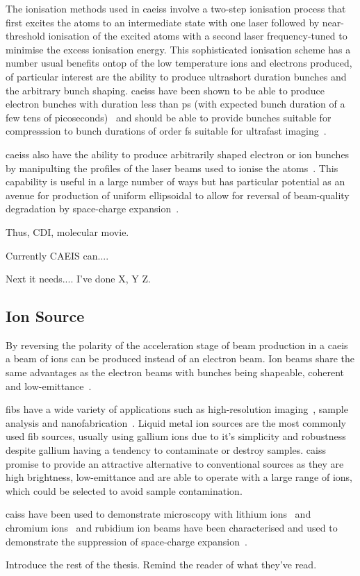 The ionisation methods used in \glspl{caeis} involve a two-step ionisation process that first excites the atoms to an intermediate state with one laser followed by near-threshold ionisation of the excited atoms with a second laser frequency-tuned to minimise the excess ionisation energy.
This sophisticated ionisation scheme has a number usual benefits ontop of the low temperature ions and electrons produced, of particular interest are the ability to produce ultrashort duration bunches and the arbitrary bunch shaping.
\Glspl{caeis} have been shown to be able to produce electron bunches with duration less than \unit[130]{ps} (with expected bunch duration of a few tens of picoseconds)~\cite{speirs_identification_2017} and should be able to provide bunches suitable for compresssion to bunch durations of order \unit[100]{fs} suitable for ultrafast imaging~\cite{van_oudheusden_compression_2010}.

\Glspl{caeis} also have the ability to produce arbitrarily shaped electron or ion bunches by manipulting the profiles of the laser beams used to ionise the atoms~\cite{mcculloch_arbitrarily_2011}.
This capability is useful in a large number of ways but has particular potential as an avenue for production of uniform ellipsoidal to allow for reversal of beam-quality degradation by space-charge expansion~\cite{luiten_how_2004}.

{\color{red}
Thus, CDI, molecular movie.

Currently CAEIS can....

Next it needs.... I've done X, Y Z.}


\subsection{Ion Source}

By reversing the polarity of the acceleration stage of beam production in a \gls{caeis} a beam of ions can be produced instead of an electron beam.
Ion beams share the same advantages as the electron beams with bunches being shapeable, coherent and low-emittance~\cite{knuffman_cold_2013}.

\Glspl{fib} have a wide variety of applications such as high-resolution imaging~\cite{scipioni_helium_2008}, sample analysis and nanofabrication~\cite{khizroev_focused-ion-beam-based_2004}.
Liquid metal ion sources are the most commonly used \gls{fib} sources, usually using gallium ions due to it's simplicity and robustness despite gallium having a tendency to contaminate or destroy samples.
\Glspl{cais} promise to provide an attractive alternative to conventional sources as they are high brightness, low-emittance and are able to operate with a large range of ions, which could be selected to avoid sample contamination.

\Glspl{cais} have been used to demonstrate microscopy with lithium ions~\cite{knuffman_nanoscale_2011} and chromium ions~\cite{steele_focused_2010} and rubidium ion beams have been characterised and used to demonstrate the suppression of space-charge expansion~\cite{murphy_detailed_2014,thompson_suppression_2016}.


{\color{red}Introduce the rest of the thesis. Remind the reader of what they've read.}

